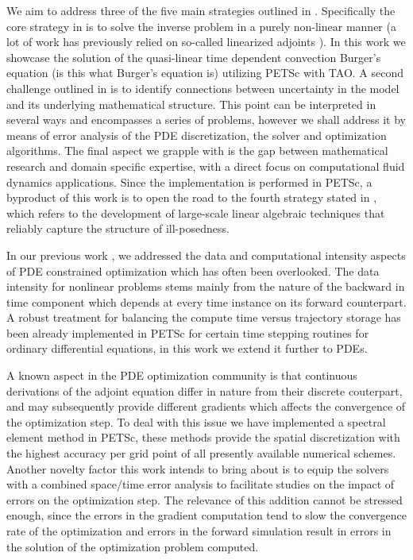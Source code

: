 \documentclass[10pt]{article}
\begin{document}
We aim to address three of the five main strategies outlined in
\cite{Brown_2008}. Specifically the core strategy in \cite{Brown_2008}
is to solve the inverse problem in a purely
non-linear manner (a lot of work has previously relied on so-called linearized adjoints \cite{}).
In this work we showcase the solution of the quasi-linear time dependent
convection Burger's equation (is this what Burger's equation is) utilizing PETSc with TAO.
A second  challenge outlined in \cite{Brown_2008} is to identify connections between uncertainty in the model
and its underlying mathematical structure. This point can be
interpreted in several ways and encompasses a series of problems,
however we shall address it by means of error analysis of the
PDE discretization, the solver and optimization algorithms. The final
aspect we grapple with is the gap between mathematical
research and domain specific expertise, with a direct focus on
computational fluid dynamics applications. Since the implementation is
performed in PETSc, a byproduct of this work is to open
the road to the fourth strategy stated in \cite{Brown_2008}, which
refers to the development of large-scale linear algebraic techniques
that reliably capture the structure of ill-posedness.

In our previous work \cite{schanen_2016}, we addressed the data and
computational intensity aspects of PDE constrained optimization which
has often been overlooked.  The data intensity for nonlinear problems
stems mainly from the nature of the backward in time component which
depends at every time instance on its forward counterpart. A robust
treatment for balancing the compute time versus trajectory storage has
been already implemented in PETSc for certain time stepping routines
for ordinary differential equations, in this work we extend it further
to PDEs.

A known aspect in the PDE optimization community is that continuous
derivations of the adjoint equation differ in nature from their
discrete couterpart, and may subsequently provide different gradients
which affects the convergence of the optimization step. To deal with
this issue we have implemented a spectral element method in PETSc,
these methods provide the spatial discretization with the highest
accuracy per grid point of all presently available numerical
schemes. Another novelty factor this work intends to bring about is to
equip the solvers with a combined space/time error analysis to
facilitate studies on the impact of errors on the optimization
step. The relevance of this addition cannot be stressed enough, since
the errors in the gradient computation tend to slow the convergence
rate of the optimization and errors in the forward simulation result
in errors in the solution of the optimization problem computed.
\end{document}
